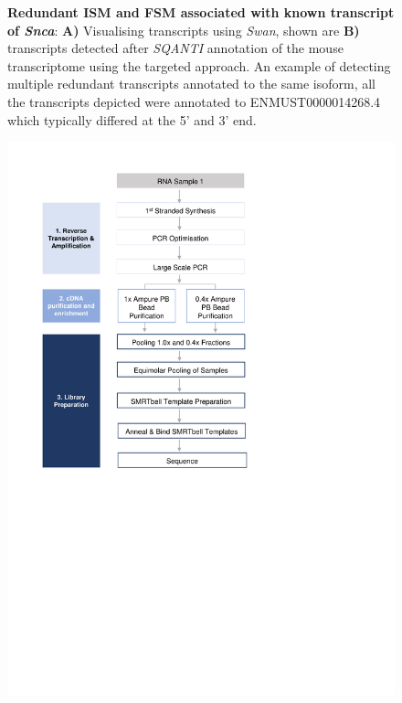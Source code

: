 \begin{figure}[htp]
\begin{center}
	\end{center}
	\captionsetup{width=0.95\textwidth}
	\caption[Redundant ISM and FSM associated with same known isoform]%
	{\textbf{Redundant ISM and FSM associated with known transcript of \textit{Snca}}: \textbf{A)} Visualising transcripts using \textit{Swan}, shown are \textbf{B)} transcripts detected after \textit{SQANTI} annotation of the mouse transcriptome using the targeted approach. An example of detecting multiple redundant transcripts annotated to the same isoform, all the transcripts depicted were annotated to ENMUST0000014268.4 which typically differed at the 5' and 3' end.}
	\label{fig:redudant_sncatranscripts}
\end{figure}

\begin{figure}[htp]
	\centering
	\includegraphics[page=9,trim={0cm 12cm 0cm 0cm},clip,scale = 0.8]{Figures/ProjectDevelopment_Figures.pdf}

\end{figure}
